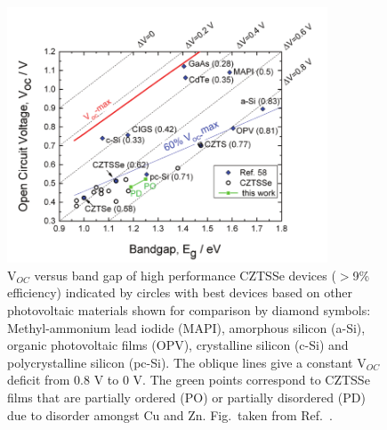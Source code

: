 \documentclass[11pt, twoside]{report}
\begin{document}
\begin{figure}[h!]
  \centering
    \includegraphics[width=0.85\textwidth]{figures/Voc.png}
    \caption[V$_{OC}$ versus band gap of high performance CZTSSe devices ($>$9\% efficiency) indicated by circles with best devices based on other photovoltaic materials shown for comparison by diamond symbols: Methyl-ammonium lead iodide (MAPI), amorphous silicon (a-Si), organic photovoltaic films (OPV), crystalline silicon (c-Si) and polycrystalline silicon (pc-Si). The oblique lines give a constant V$_{OC}$ deficit from 0.8 V to 0 V. The green points correspond to CZTSSe films that are partially ordered (PO) or partially disordered (PD) due to disorder amongst Cu and Zn.]{V$_{OC}$ versus band gap of high performance CZTSSe devices ($>$9\% efficiency) indicated by circles with best devices based on other photovoltaic materials shown for comparison by diamond symbols: Methyl-ammonium lead iodide (MAPI), amorphous silicon (a-Si), organic photovoltaic films (OPV), crystalline silicon (c-Si) and polycrystalline silicon (pc-Si). The oblique lines give a constant V$_{OC}$ deficit from 0.8 V to 0 V. The green points correspond to CZTSSe films that are partially ordered (PO) or partially disordered (PD) due to disorder amongst Cu and Zn. Fig.~taken from Ref.~.}
  \label{Voc}
\end{figure}
\end{document}

